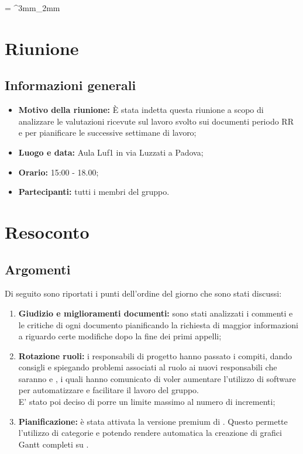 \documentclass[VER-2018-01-29.tex]{subfiles}
\begin{document}
\tabulinesep = ^3mm_2mm
\chapter{Riunione}

\section{Informazioni generali}	
\begin{itemize}
	\item \textbf{Motivo della riunione:} \`{E} stata indetta questa riunione a scopo di analizzare le valutazioni ricevute sul lavoro svolto sui documenti periodo RR e per pianificare le successive settimane di lavoro;
	\item \textbf{Luogo e data:} Aula Luf1 in via Luzzati a Padova;
	\item \textbf{Orario:} 15:00 - 18.00;
	\item \textbf{Partecipanti:} tutti i membri del gruppo.
\end{itemize}

\chapter{Resoconto}

\section{Argomenti}	
Di seguito sono riportati i punti dell'ordine del giorno che sono stati discussi:
\begin{enumerate}
	\item \textbf{Giudizio e miglioramenti documenti:} sono stati analizzati i commenti e le critiche di ogni documento pianificando la richiesta di maggior informazioni a \Vardanega riguardo certe modifiche dopo la fine dei primi appelli;
	
	\item \textbf{Rotazione ruoli:} i responsabili di progetto hanno passato i compiti, dando consigli e spiegando problemi associati al ruolo ai nuovi responsabili che saranno \Davide{} e \Riccardo{}, i quali hanno comunicato di voler aumentare l'utilizzo di software per automatizzare e facilitare il lavoro del gruppo. \\
	E' stato poi deciso di porre un limite massimo al numero di incrementi;
	
	\item \textbf{Pianificazione:} è stata attivata la versione premium di . Questo permette l'utilizzo di categorie e potendo rendere automatica la creazione di grafici Gantt completi su . 
	
	 
\end{enumerate} 
\end{document}
